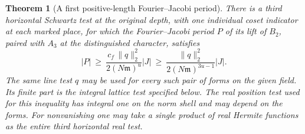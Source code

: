 \documentclass[a4paper,11pt]{article}
\newtheorem{theorem}[proposition]{Theorem}
\theoremstyle{definition}
\theoremstyle{remark}
\numberwithin{equation}{section}
\begin{document}
\begin{theorem}[A first positive-length Fourier--Jacobi period]\leavevmode
\label{thm:third263}
There is a third horizontal Schwartz test at the original depth,
with one individual coset indicator at each marked place, for
which the Fourier--Jacobi period \(P\) of its lift of \(B_2\),
paired with \(A_3\) at the distinguished character, satisfies
\[
  |P|\ \ge\ \frac{c_f\,\|q\|_2^2}{2(N\mathfrak m)^u}|J|
       \ \ge\ \frac{\|q\|_2^2}{2(N\mathfrak m)^{3u-1}}|J| .
\]
The same line test \(q\) may be used for every such pair of
forms on the given field. Its finite part is the integral
lattice test specified below. The real position test used
for this inequality has integral one on the norm shell and
may depend on the forms. For nonvanishing one may take a single
product of real Hermite functions as the entire third horizontal
real test.
\end{theorem}
\end{document}
